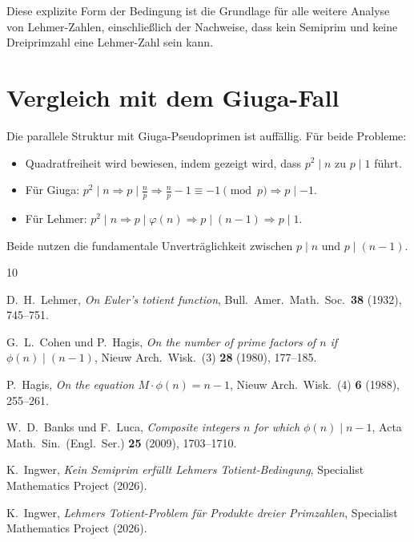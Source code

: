 \documentclass[12pt,a4paper]{amsart}
\theoremstyle{definition}
\newcommand{\euler}{\varphi}
\begin{document}
Diese explizite Form der Bedingung ist die Grundlage für alle weitere Analyse von
Lehmer-Zahlen, einschließlich der Nachweise, dass kein Semiprim \cite{Ingwer2026b}
und keine Dreiprimzahl \cite{Ingwer2026lehmer3} eine Lehmer-Zahl sein kann.

\section{Vergleich mit dem Giuga-Fall}

Die parallele Struktur mit Giuga-Pseudoprimen ist auffällig. Für beide Probleme:
\begin{itemize}
  \item Quadratfreiheit wird bewiesen, indem gezeigt wird, dass $p^2 \mid n$ zu $p \mid 1$ führt.
  \item Für Giuga: $p^2 \mid n \Rightarrow p \mid \tfrac{n}{p} \Rightarrow \tfrac{n}{p}-1 \equiv -1 \pmod{p} \Rightarrow p \mid -1$.
  \item Für Lehmer: $p^2 \mid n \Rightarrow p \mid \euler(n) \Rightarrow p \mid (n-1) \Rightarrow p \mid 1$.
\end{itemize}
Beide nutzen die fundamentale Unverträglichkeit zwischen $p \mid n$ und $p \mid (n-1)$.

\begin{thebibliography}{10}

D.~H.~Lehmer,
\emph{On Euler's totient function},
Bull.\ Amer.\ Math.\ Soc.\ \textbf{38} (1932), 745--751.

G.~L.~Cohen und P.~Hagis,
\emph{On the number of prime factors of $n$ if $\phi(n) \mid (n-1)$},
Nieuw Arch.\ Wisk.\ (3) \textbf{28} (1980), 177--185.

P.~Hagis,
\emph{On the equation $M \cdot \phi(n) = n - 1$},
Nieuw Arch.\ Wisk.\ (4) \textbf{6} (1988), 255--261.

W.~D.~Banks und F.~Luca,
\emph{Composite integers $n$ for which $\phi(n) \mid n - 1$},
Acta Math.\ Sin.\ (Engl.\ Ser.) \textbf{25} (2009), 1703--1710.

K.~Ingwer,
\emph{Kein Semiprim erfüllt Lehmers Totient-Bedingung},
Specialist Mathematics Project (2026).

K.~Ingwer,
\emph{Lehmers Totient-Problem für Produkte dreier Primzahlen},
Specialist Mathematics Project (2026).

\end{thebibliography}
\end{document}
